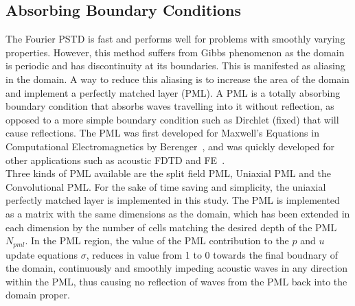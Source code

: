 \subsection{Absorbing Boundary Conditions}
The Fourier PSTD is fast and performs well for problems with smoothly varying properties. However, this method suffers from Gibbs phenomenon as the domain is periodic and has discontinuity at its boundaries. This is manifested as aliasing in the domain. A way to reduce this aliasing is to increase the area of the domain and implement a perfectly matched layer (PML). A PML is a totally absorbing boundary condition that absorbs waves travelling into it without reflection, as opposed to a more simple boundary condition such as Dirchlet (fixed) that will cause reflections. The PML was first developed for Maxwell's Equations in Computational Electromagnetics by Berenger~\cite{Berenger1994}, and was quickly developed for other applications such as acoustic FDTD and FE~\cite{Liu1997}.\\

Three kinds of PML available are the split field PML, Uniaxial PML and the Convolutional PML. For the sake of time saving and simplicity, the uniaxial perfectly matched layer is implemented in this study. The PML is implemented as a matrix with the same dimensions as the domain, which has been extended in each dimension by the number of cells matching the desired depth of the PML $N_{pml}$. In the PML region, the value of the PML contribution to the $p$ and $u$ update equations $\sigma$, reduces in value from 1 to 0 towards the final boudnary of the domain, continuously and smoothly impeding acoustic waves in any direction within the PML, thus causing no reflection of waves from the PML back into the domain proper.\\
 
